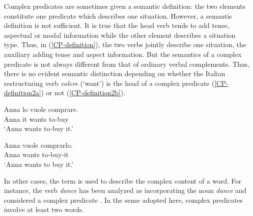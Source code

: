 \documentclass[output=paper]{langsci/langscibook}
\begin{document}
\begin{exe}
	\ex \label{CP-definition1} 
	\begin{xlist}
		
		
		
		
	\end{xlist}
\end{exe}



Complex predicates are sometimes given a semantic definition: the two elements constitute one predicate which describes one situation. However, a semantic definition is not sufficient. It is true that the head verb tends to add tense, aspectual or modal information while the other element describes a situation type. Thus, in (\ref{CP-definition}), the two verbs jointly describe one situation, the auxiliary adding tense and aspect information. But the semantics of a complex predicate is not always different from that of ordinary verbal complements. Thus, there is no evident semantic distinction depending on whether the Italian restructuring verb \textit{volere} (`want') is the head of a complex predicate (\ref{CP-definition2a}) or not (\ref{CP-definition2b}). 

\begin{exe}
	\ex \label{CP-definition2} 
	\begin{xlist}
		
		\ex  \label{CP-definition2a}
		\gll  Anna lo vuole comprare.  \citep[Italian,][]{Monachesi98a}\\
		Anna it wants to-buy \\
		\glt `Anna wants to-buy it.'
		
		\ex  \label{CP-definition2b}
		\gll  Anna vuole comprarlo. \\
		Anna wants to-buy-it \\
		\glt `Anna wants to buy it.'    
		
	\end{xlist}
\end{exe}


In other cases, the term is used to describe the complex content of a word. For instance, the verb  \textit{dance} has been analyzed as incorporating the noun  \textit{dance} and considered a complex predicate \citep{HK97a-u}. In the sense adopted here, complex predicates involve at least two words. 
\end{document}
